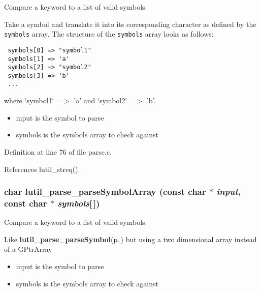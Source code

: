 Compare a keyword to a list of valid symbols. 

Take a symbol and translate it into its corresponding character as defined by the {\tt symbols} array. The structure of the {\tt symbols} array looks as follows: 

\footnotesize\begin{verbatim} symbols[0] => "symbol1"
 symbols[1] => 'a'
 symbols[2] => "symbol2"
 symbols[3] => 'b'
 ...
\end{verbatim}
\normalsize
where \char`\"{}symbol1\char`\"{} =$>$ 'a' and \char`\"{}symbol2\char`\"{} =$>$ 'b'.

\begin{itemize}
\item input is the symbol to parse \item symbols is the symbols array to check against 
\end{itemize}


Definition at line 76 of file parse.c.

References lutil\_\-streq().
\subsubsection{\setlength{\rightskip}{0pt plus 5cm}char lutil\_\-parse\_\-parse\-Symbol\-Array (const char $\ast$ {\em input}, const char $\ast$ {\em symbols}[$\,$])}\label{parse_8h_a2}


Compare a keyword to a list of valid symbols. 

Like {\bf lutil\_\-parse\_\-parse\-Symbol}{\rm (p.\,\pageref{parse_8h_a1})} but using a two dimensional array instead of a GPtr\-Array

\begin{itemize}
\item input is the symbol to parse \item symbols is the symbols array to check against 
\end{itemize}


